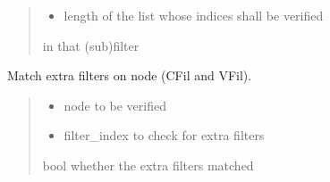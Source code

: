 \documentclass[a4paper,10pt,english]{sphinxmanual}
\begin{document}
\begin{fulllineitems}
\begin{fulllineitems}
\begin{quote}
\begin{description}
\begin{itemize}
\item {}
\sphinxAtStartPar
{} \textendash{} length of the list whose indices shall be verified

\end{itemize}

\sphinxAtStartPar
\begin{description}
\sphinxAtStartPar
in that (sub)filter

\end{description}


\end{description}\end{quote}

\end{fulllineitems}


\begin{fulllineitems}
\label{\detokenize{fagus.filters:fagus.filters.KFil.match_extra_filters}}
\pysigstartsignatures
{}
\pysigstopsignatures
\sphinxAtStartPar
Match extra filters on node (CFil and VFil).
\begin{quote}\begin{description}
\begin{itemize}
\item {}
\sphinxAtStartPar
{} \textendash{} node to be verified

\item {}
\sphinxAtStartPar
{} \textendash{} filter\_index to check for extra filters

\end{itemize}

\sphinxAtStartPar
bool whether the extra filters matched

\end{description}\end{quote}


\end{fulllineitems}
\end{fulllineitems}
\end{document}
